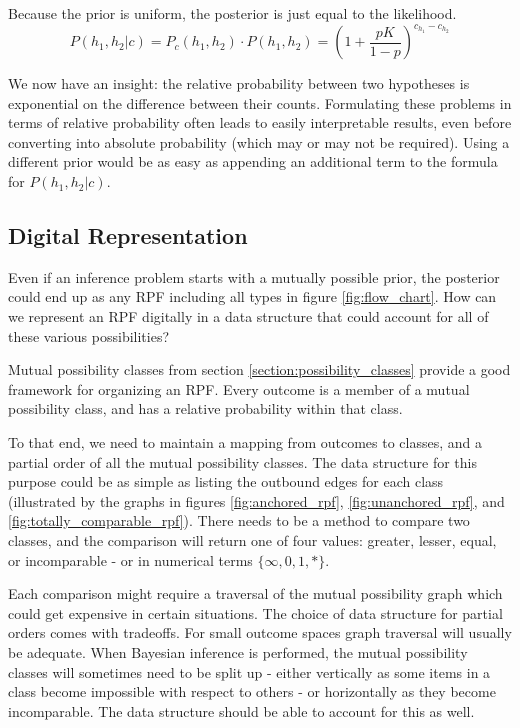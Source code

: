 \documentclass[twoside]{article}
\theoremstyle{plain}%
\theoremstyle{definition}
\theoremstyle{remark}
\begin{document}
Because the prior is uniform, the posterior is just equal to the likelihood.
\[P(h_1, h_2 | c) = P_c(h_1, h_2) \cdot P(h_1, h_2) = \left(1 + \frac{pK}{1-p}\right)^{c_{h_1} - c_{h_2}} \]

We now have an insight: the relative probability between two hypotheses is exponential on the difference between their counts. Formulating these problems in terms of relative probability often leads to easily interpretable results, even before converting into absolute probability (which may or may not be required). Using a different prior would be as easy as appending an additional term to the formula for \(P(h_1, h_2|c)\).

\subsection{Digital Representation}

Even if an inference problem starts with a mutually possible prior, the posterior could end up as any RPF including all types in figure \ref{fig:flow_chart}. How can we represent an RPF digitally in a data structure that could account for all of these various possibilities?

Mutual possibility classes from section \ref{section:possibility_classes} provide a good framework for organizing an RPF. Every outcome is a member of a mutual possibility class, and has a relative probability within that class.

To that end, we need to maintain a mapping from outcomes to classes, and a partial order of all the mutual possibility classes. The data structure for this purpose could be as simple as listing the outbound edges for each class (illustrated by the graphs in figures \ref{fig:anchored_rpf}, \ref{fig:unanchored_rpf}, and \ref{fig:totally_comparable_rpf}). There needs to be a method to compare two classes, and the comparison will return one of four values: greater, lesser, equal, or incomparable - or in numerical terms \(\{\infty, 0, 1, \ast\}\).

Each comparison might require a traversal of the mutual possibility graph which could get expensive in certain situations. The choice of data structure for partial orders comes with tradeoffs. For small outcome spaces graph traversal will usually be adequate. When Bayesian inference is performed, the mutual possibility classes will sometimes need to be split up - either vertically as some items in a class become impossible with respect to others - or horizontally as they become incomparable. The data structure should be able to account for this as well.
\end{document}

